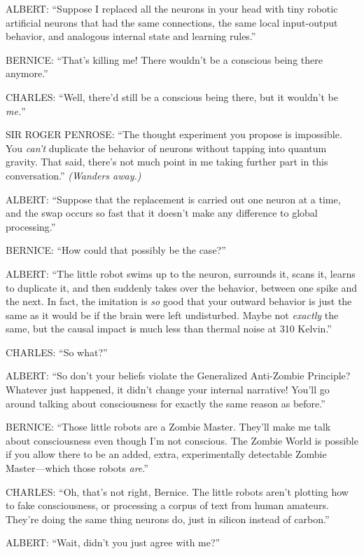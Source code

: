 {
 ALBERT: ``Suppose I replaced all the neurons in
your head with tiny robotic artificial neurons that had the same
connections, the same local input-output behavior, and analogous
internal state and learning rules.''}

{
 BERNICE: ``That's killing me!
There wouldn't be a conscious being there
anymore.''}

{
 CHARLES: ``Well, there'd still be
a conscious being there, but it wouldn't be
\textit{me.}''}

{
 SIR ROGER PENROSE: ``The thought experiment you
propose is impossible. You \textit{can't} duplicate the
behavior of neurons without tapping into quantum gravity. That said,
there's not much point in me taking further part in
this conversation.'' \textit{(Wanders away.)}}

{
 ALBERT: ``Suppose that the replacement is carried
out one neuron at a time, and the swap occurs so fast that it
doesn't make any difference to global
processing.''}

{
 BERNICE: ``How could that possibly be the
case?''}

{
 ALBERT: ``The little robot swims up to the
neuron, surrounds it, scans it, learns to duplicate it, and then
suddenly takes over the behavior, between one spike and the next. In
fact, the imitation is \textit{so} good that your outward behavior is
just the same as it would be if the brain were left undisturbed. Maybe
not \textit{exactly} the same, but the causal impact is much less than
thermal noise at 310 Kelvin.''}

{
 CHARLES: ``So what?''}

{
 ALBERT: ``So don't your beliefs
violate the Generalized Anti-Zombie Principle? Whatever just happened,
it didn't change your internal narrative!
You'll go around talking about consciousness for
exactly the same reason as before.''}

{
 BERNICE: ``Those little robots are a Zombie
Master. They'll make me talk about consciousness even
though I'm not conscious. The Zombie World is possible
if you allow there to be an added, extra, experimentally detectable
Zombie Master---which those robots \textit{are}.''}

{
 CHARLES: ``Oh, that's not right,
Bernice. The little robots aren't plotting how to fake
consciousness, or processing a corpus of text from human amateurs.
They're doing the same thing neurons do, just in
silicon instead of carbon.''}

{
 ALBERT: ``Wait, didn't you just
agree with me?''}

